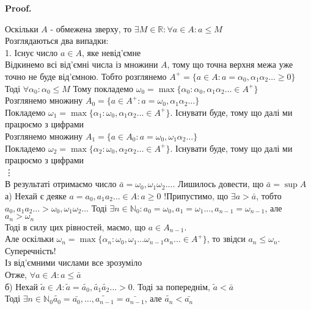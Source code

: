 \documentclass[a4paper, 14pt]{article}
\makeatletter
\def\qed{$\blacksquare$}
\theoremstyle{theoremdd}
\theoremstyle{theoremdd}
\theoremstyle{theoremdd}
\theoremstyle{theoremdd}
\theoremstyle{theoremdd}
\theoremstyle{theoremdd}
\theoremstyle{theoremdd}
\theoremstyle{theoremdd}
\renewenvironment{proof}[1][Proof.\\]{\par
\pushQED{\hfill \qed}%
\normalfont \topsep6\p@\@plus6\p@\relax
\trivlist
\item\relax
{\bfseries
#1\@addpunct{.}}\hspace\labelsep\ignorespaces
}{%
\popQED\endtrivlist\@endpefalse
}
\makeatother
\begin{document}
\begin{proof}
Оскільки $A$ - обмежена зверху, то $\exists M \in \mathbb{R}: \forall a \in A: a \leq M$\\
Розглядаються два випадки:\\
1. Існує число $a \in A$, яке невід'ємне\\
Відкинемо всі від'ємні числа із множини $A$, тому що точна верхня межа уже точно не буде від'ємною. Тобто розглянемо $A^+ = \{a \in A: a = \alpha_0,\alpha_1\alpha_2\dots \geq 0 \}$\\
Тоді $\forall \alpha_0: \alpha_0 \leq M$ Тому покладемо $\omega_0 = \max \{ \alpha_0: \alpha_0,\alpha_1\alpha_2\dots \in A^+\}$\\
Розглянемо множину $A_0 = \{a \in A^+: a = \omega_0, \alpha_1 \alpha_2 \dots\}$\\
Покладемо $\omega_1 = \max \{\alpha_1: \omega_0, \alpha_1\alpha_2\dots \in A^+ \}$. Існувати буде, тому що далі ми працюємо з цифрами\\
Розглянемо множину $A_1 = \{a \in A_0: a = \omega_0, \omega_1 \alpha_2 \dots\}$\\
Покладемо $\omega_2 = \max \{\alpha_2: \omega_0, \alpha_2\alpha_2\dots \in A^+ \}$. Існувати буде, тому що далі ми працюємо з цифрами\\
\vdots \\
В результаті отримаємо число $\bar{a} = \omega_0, \omega_1 \omega_2 \dots$. Лишилось довести, що $\bar{a} = \sup A$\\
а) Нехай є деяке $a = a_0,a_1a_2\dots \in A: a \geq 0$ !Припустимо, що $\exists a > \bar{a}$, тобто $a_0,a_1a_2 \dots > \omega_0, \omega_1 \omega_2 \dots$ Тоді $\exists n \in \mathbb{N}_0: a_0 = \omega_0, a_1 = \omega_1 \dots, a_{n-1} = \omega_{n-1}$, але $a_{n} > \omega_{n}$\\
Тоді в силу цих рівностей, маємо, що $a \in A_{n-1}$. \\ 
Але оскільки $\omega_n = \max \{\alpha_n: \omega_0,\omega_1\dots \omega_{n-1} \alpha_n \dots \in A^+\}$, то звідси $a_n \leq \omega_n$. Суперечність!\\
Із від'ємними числами все зрозуміло\\
Отже, $\forall a \in A: a \leq \bar{a}$
\bigskip \\
б) Нехай $\tilde{a} \in A: \tilde{a} = \tilde{a_0},\tilde{a_1}\tilde{a_2}\dots > 0$. Тоді за попереднім, $\tilde{a} < \bar{a}$\\
Тоді $\exists n \in \mathbb{N}_0 \tilde{a_0} = \bar{a_0}, \dots, \tilde{a_{n-1}} = \bar{a_{n-1}}$, але $\tilde{a_n} < \bar{a_n}$\\

\end{proof}
\end{document}
